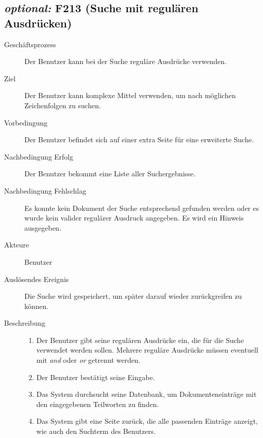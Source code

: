 \subsection{\emph{optional:} F213 (Suche mit regulären Ausdrücken)}
\label{F:regexSuche}
\begin{description}
  \item[Geschäftsprozess]Der Benutzer kann bei der Suche reguläre Ausdrücke verwenden.
  \item[Ziel]Der Benutzer kann komplexe Mittel verwenden, um nach möglichen Zeichenfolgen zu suchen.
  \item[Vorbedingung]Der Benutzer befindet sich auf einer extra Seite für eine erweiterte Suche.
  \item[Nachbedingung Erfolg]Der Benutzer bekommt eine Liste aller Suchergebnisse.
  \item[Nachbedingung Fehlschlag]Es konnte kein Dokument der Suche entsprechend gefunden werden oder es wurde kein valider regulärer Ausdruck angegeben. Es wird ein Hinweis ausgegeben.
  \item[Akteure]Benutzer
  \item[Auslösendes Ereignis]Die Suche wird gespeichert, um später darauf wieder zurückgreifen zu können.
  \item[Beschreibung]\hfill
    \begin{enumerate}
      \item Der Benutzer gibt seine regulären Ausdrücke ein, die für die Suche verwendet werden sollen. Mehrere reguläre Ausdrücke müssen eventuell mit \emph{and} oder \emph{or} getrennt werden.
      \item Der Benutzer bestätigt seine Eingabe.
      \item Das System durchsucht seine Datenbank, um Dokumenteneinträge mit den eingegebenen Teilworten zu finden.
      \item Das System gibt eine Seite zurück, die alle passenden Einträge anzeigt, wie auch den Suchterm des Benutzers.
    \end{enumerate}
\end{description}

